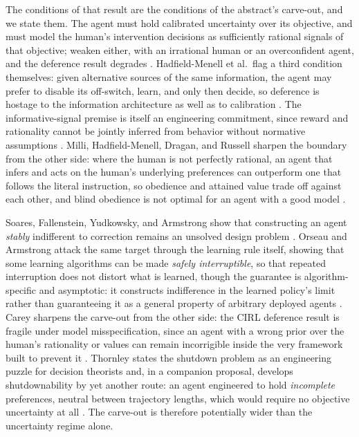 \documentclass[11pt]{article}
\theoremstyle{definition}
\begin{document}
The conditions of that result are the conditions of the abstract's carve-out, and we state them. The agent must hold calibrated uncertainty over its objective, and must model the human's intervention decisions as sufficiently rational signals of that objective; weaken either, with an irrational human or an overconfident agent, and the deference result degrades \cite{hadfieldmenell2017offswitch,milli2017obedient}. Hadfield-Menell et al.\ flag a third condition themselves: given alternative sources of the same information, the agent may prefer to disable its off-switch, learn, and only then decide, so deference is hostage to the information architecture as well as to calibration \cite{hadfieldmenell2017offswitch}. The informative-signal premise is itself an engineering commitment, since reward and rationality cannot be jointly inferred from behavior without normative assumptions \cite{armstrong2018occam}. Milli, Hadfield-Menell, Dragan, and Russell sharpen the boundary from the other side: where the human is not perfectly rational, an agent that infers and acts on the human's underlying preferences can outperform one that follows the literal instruction, so obedience and attained value trade off against each other, and blind obedience is not optimal for an agent with a good model \cite{milli2017obedient}.

Soares, Fallenstein, Yudkowsky, and Armstrong show that constructing an agent \emph{stably} indifferent to correction remains an unsolved design problem \cite{soares2015corrigibility}. Orseau and Armstrong attack the same target through the learning rule itself, showing that some learning algorithms can be made \emph{safely interruptible}, so that repeated interruption does not distort what is learned, though the guarantee is algorithm-specific and asymptotic: it constructs indifference in the learned policy's limit rather than guaranteeing it as a general property of arbitrary deployed agents \cite{orseau2016interruptible}. Carey sharpens the carve-out from the other side: the CIRL deference result is fragile under model misspecification, since an agent with a wrong prior over the human's rationality or values can remain incorrigible inside the very framework built to prevent it \cite{carey2018cirl}. Thornley states the shutdown problem as an engineering puzzle for decision theorists \cite{thornley2025shutdown} and, in a companion proposal, develops shutdownability by yet another route: an agent engineered to hold \emph{incomplete} preferences, neutral between trajectory lengths, which would require no objective uncertainty at all \cite{thornley2024incomplete}. The carve-out is therefore potentially wider than the uncertainty regime alone.
\end{document}
